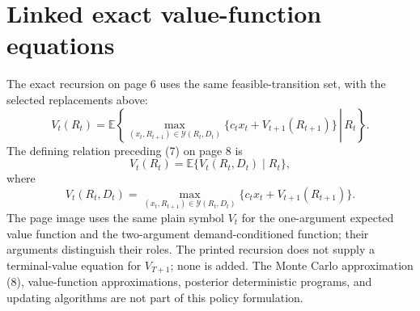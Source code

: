 \documentclass{article}
\begin{document}
\section*{Linked exact value-function equations}
The exact recursion on page 6 uses the same feasible-transition set, with the selected replacements above:
\begin{equation}
V_t(R_t)=\mathbb{E}\left\{\left.
\max_{(x_t,R_{t+1})\in\mathcal{Y}(R_t,D_t)}
\bigl\{c_tx_t+V_{t+1}(R_{t+1})\bigr\}
\,\right|\,R_t\right\}.
\tag{6}
\end{equation}
The defining relation preceding (7) on page 8 is
\[
V_t(R_t)=\mathbb{E}\{V_t(R_t,D_t)\mid R_t\},
\]
where
\begin{equation}
V_t(R_t,D_t)=
\max_{(x_t,R_{t+1})\in\mathcal{Y}(R_t,D_t)}
\bigl\{c_tx_t+V_{t+1}(R_{t+1})\bigr\}.
\tag{7}
\end{equation}
The page image uses the same plain symbol \(V_t\) for the one-argument expected value function and the two-argument demand-conditioned function; their arguments distinguish their roles. The printed recursion does not supply a terminal-value equation for \(V_{T+1}\); none is added. The Monte Carlo approximation (8), value-function approximations, posterior deterministic programs, and updating algorithms are not part of this policy formulation.
\end{document}
